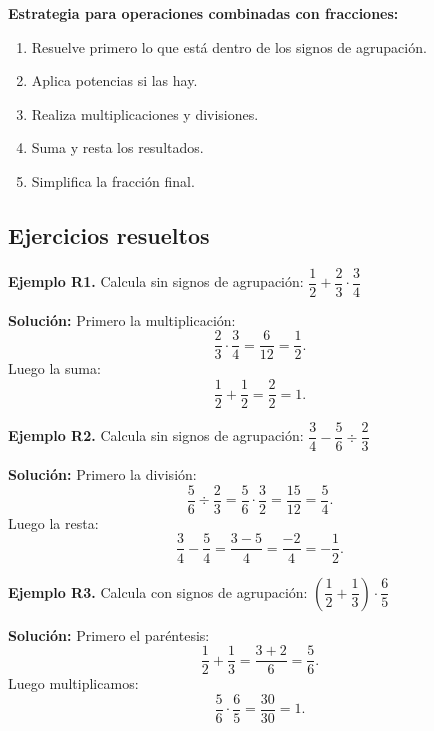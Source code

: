 \documentclass[12pt, letterpaper]{article}
\begin{document}
\newpage %

\begin{cuadropasos}
  \textbf{Estrategia para operaciones combinadas con fracciones:}
  \begin{enumerate}[leftmargin=*]
    \item Resuelve primero lo que está dentro de los signos de agrupación.
    \item Aplica potencias si las hay.
    \item Realiza multiplicaciones y divisiones.
    \item Suma y resta los resultados.
    \item Simplifica la fracción final.
  \end{enumerate}
\end{cuadropasos}

\subsection{Ejercicios resueltos}

\textbf{Ejemplo R1.} Calcula sin signos de agrupación: $\dfrac{1}{2} + \dfrac{2}{3} \cdot \dfrac{3}{4}$

\begin{cuadrosolucion}
  \textbf{Solución:} Primero la multiplicación:
  $$\frac{2}{3} \cdot \frac{3}{4} = \frac{6}{12} = \frac{1}{2}.$$
  Luego la suma:
  $$\frac{1}{2} + \frac{1}{2} = \frac{2}{2} = 1.$$
\end{cuadrosolucion}

\textbf{Ejemplo R2.} Calcula sin signos de agrupación: $\dfrac{3}{4} - \dfrac{5}{6} \div \dfrac{2}{3}$

\begin{cuadrosolucion}
  \textbf{Solución:} Primero la división:
  $$\frac{5}{6} \div \frac{2}{3} = \frac{5}{6} \cdot \frac{3}{2} = \frac{15}{12} = \frac{5}{4}.$$
  Luego la resta:
  $$\frac{3}{4} - \frac{5}{4} = \frac{3 - 5}{4} = \frac{-2}{4} = -\frac{1}{2}.$$
\end{cuadrosolucion}

\textbf{Ejemplo R3.} Calcula con signos de agrupación: $\left(\dfrac{1}{2} + \dfrac{1}{3}\right) \cdot \dfrac{6}{5}$

\begin{cuadrosolucion}
  \textbf{Solución:} Primero el paréntesis:
  $$\frac{1}{2} + \frac{1}{3} = \frac{3 + 2}{6} = \frac{5}{6}.$$
  Luego multiplicamos:
  $$\frac{5}{6} \cdot \frac{6}{5} = \frac{30}{30} = 1.$$
\end{cuadrosolucion}
\end{document}
